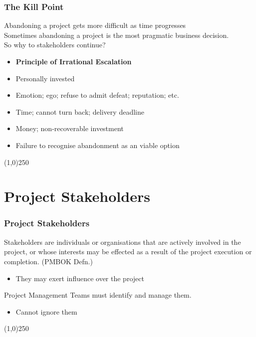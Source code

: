 \begin{frame}
\frametitle{The Kill Point}
Abandoning a project gets more difficult as time progresses\\
Sometimes abandoning a project is the most pragmatic business decision.\\
So why to stakeholders continue?\\
\begin{itemize}
\item \textbf{Principle of Irrational Escalation}
\item Personally invested
\item Emotion; ego; refuse to admit defeat; reputation; etc.
\item Time; cannot turn back; delivery deadline
\item Money; non-recoverable investment
\item Failure to recognise abandonment as an viable option
\end{itemize}
\end{frame}
\begin{center}\line(1,0){250}\end{center}



\section{Project Stakeholders}


\begin{frame}
\frametitle{Project Stakeholders}
Stakeholders are individuals or organisations that are actively involved in the project, or whose interests may be effected as a result of the project execution or completion. (PMBOK Defn.)\\
\begin{itemize}
	\item They may exert influence over the project
\end{itemize}
Project Management Teams must identify and manage them.
\begin{itemize}
	\item Cannot ignore them 
\end{itemize}
\end{frame}
\begin{center}\line(1,0){250}\end{center}



